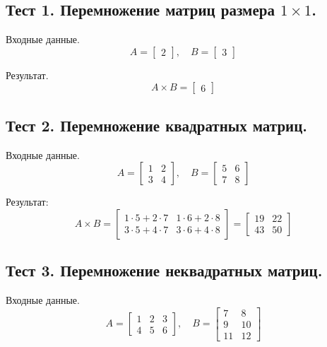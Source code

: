 \subsection*{Тест 1. Перемножение матриц размера $1 \times 1$.}

Входные данные.
\[
A = \begin{bmatrix} 2 \end{bmatrix}, \quad B = \begin{bmatrix} 3 \end{bmatrix}
\]

Результат.
\[
A \times B = \begin{bmatrix} 6 \end{bmatrix}
\]

\subsection*{Тест 2. Перемножение квадратных матриц.}

Входные данные.
\[
A = \begin{bmatrix} 1 & 2 \\ 3 & 4 \end{bmatrix}, \quad B = \begin{bmatrix} 5 & 6 \\ 7 & 8 \end{bmatrix}
\]

Результат:
\[
A \times B = \begin{bmatrix} 1 \cdot 5 + 2 \cdot 7 & 1 \cdot 6 + 2 \cdot 8 \\ 3 \cdot 5 + 4 \cdot 7 & 3 \cdot 6 + 4 \cdot 8 \end{bmatrix} = \begin{bmatrix} 19 & 22 \\ 43 & 50 \end{bmatrix}
\]

\subsection*{Тест 3. Перемножение неквадратных матриц.}

Входные данные.
\[
A = \begin{bmatrix} 1 & 2 & 3 \\ 4 & 5 & 6 \end{bmatrix}, \quad B = \begin{bmatrix} 7 & 8 \\ 9 & 10 \\ 11 & 12 \end{bmatrix}
\]

